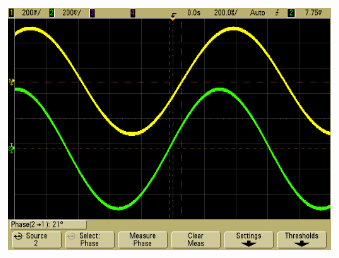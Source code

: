 \begin{frame}
\begin{columns}[c]
\begin{figure}[H]
\begin{center}
        \end{center}
        \end{figure}
        \begin{figure}[H]
        \begin{center}
                \includegraphics[scale=0.1]{./img/oszi/scope_21.png}
        \end{center}
        \end{figure}
\end{columns}
\end{frame}

